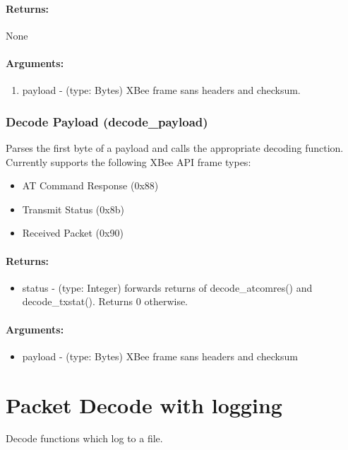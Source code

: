 \subsection{Returns:}
None
\subsection{Arguments:}
\begin{enumerate}
\item payload - (type: Bytes) XBee frame sans headers and checksum.
\end{enumerate}

\section{Decode Payload (decode\_payload)}
Parses the first byte of a payload and calls the appropriate decoding function. Currently supports the following XBee API frame types:
\begin{itemize}
\item AT Command Response (0x88)
\item Transmit Status (0x8b)
\item Received Packet (0x90)
\end{itemize}
\subsection{Returns:}
\begin{itemize}
\item status - (type: Integer) forwards returns of decode\_atcomres() and decode\_txstat(). Returns 0 otherwise.
\end{itemize}
\subsection{Arguments:}
\begin{itemize}
\item payload - (type: Bytes) XBee frame sans headers and checksum
\end{itemize}

\part{Packet Decode with logging}
Decode functions which log to a file.

